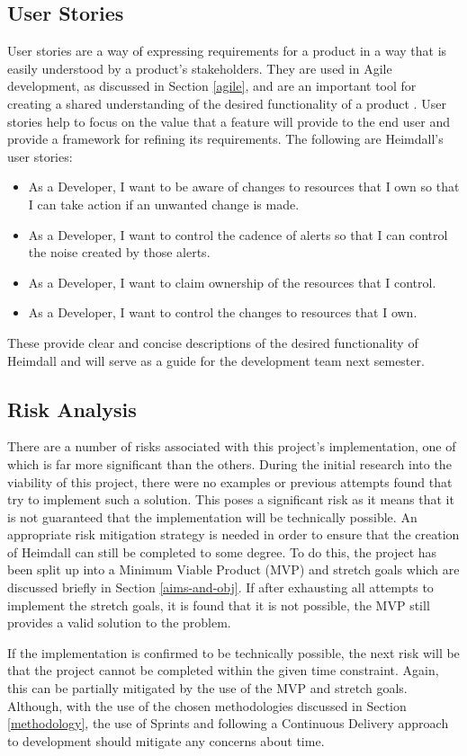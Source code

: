 \documentclass{article}
\begin{document}
\subsection{User Stories}

User stories are a way of expressing requirements for a product in a way that is easily understood by a product's stakeholders. They are used in Agile development, as discussed in Section \ref{agile}, and are an important tool for creating a shared understanding of the desired functionality of a product \cite{user-stories}. User stories help to focus on the value that a feature will provide to the end user and provide a framework for refining its requirements. The following are Heimdall's user stories:

\begin{itemize}
    \itemsep0em
    \item As a Developer, I want to be aware of changes to resources that I own so that I can take action if an unwanted change is made.
    \item As a Developer, I want to control the cadence of alerts so that I can control the noise created by those alerts.
    \item As a Developer, I want to claim ownership of the resources that I control.
    \item As a Developer, I want to control the changes to resources that I own.
\end{itemize}

These provide clear and concise descriptions of the desired functionality of Heimdall and will serve as a guide for the development team next semester.

\subsection{Risk Analysis}

There are a number of risks associated with this project's implementation, one of which is far more significant than the others. During the initial research into the viability of this project, there were no examples or previous attempts found that try to implement such a solution. This poses a significant risk as it means that it is not guaranteed that the implementation will be technically possible. An appropriate risk mitigation strategy is needed in order to ensure that the creation of Heimdall can still be completed to some degree. To do this, the project has been split up into a Minimum Viable Product (MVP) and stretch goals which are discussed briefly in Section \ref{aims-and-obj}. If after exhausting all attempts to implement the stretch goals, it is found that it is not possible, the MVP still provides a valid solution to the problem. \\\par If the implementation is confirmed to be technically possible, the next risk will be that the project cannot be completed within the given time constraint. Again, this can be partially mitigated by the use of the MVP and stretch goals. Although, with the use of the chosen methodologies discussed in Section \ref{methodology}, the use of Sprints and following a Continuous Delivery approach to development should mitigate any concerns about time.
\end{document}
